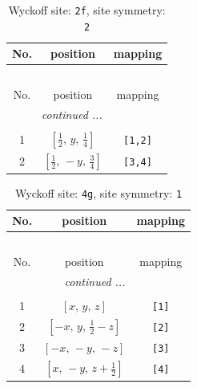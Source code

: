 \documentclass[fleqn,8pt]{jsarticle}
\begin{document}
\renewcommand{\arraystretch}{1.2}
\begin{longtable}{ccc}
\caption{Wyckoff site: {\tt 2f}, site symmetry: {\tt 2}}
 \\
 \hline \hline
No. & position & mapping \\ \hline \endfirsthead

\multicolumn{2}{l}{\tablename\ \thetable{}} \\
 \hline \hline
No. & position & mapping \\ \hline \endhead

 \hline \hline
\multicolumn{2}{r}{\footnotesize\it continued ...} \\ \endfoot

 \hline \hline
\multicolumn{2}{r}{} \\ \endlastfoot

1 & $\left[ \frac{1}{2},\, y,\, \frac{1}{4} \right]$ & {\tt [1,2]} \\ \hline
2 & $\left[ \frac{1}{2},\, - y,\, \frac{3}{4} \right]$ & {\tt [3,4]} \\
\end{longtable}
\renewcommand{\arraystretch}{1.2}
\begin{longtable}{ccc}
\caption{Wyckoff site: {\tt 4g}, site symmetry: {\tt 1}}
 \\
 \hline \hline
No. & position & mapping \\ \hline \endfirsthead

\multicolumn{2}{l}{\tablename\ \thetable{}} \\
 \hline \hline
No. & position & mapping \\ \hline \endhead

 \hline \hline
\multicolumn{2}{r}{\footnotesize\it continued ...} \\ \endfoot

 \hline \hline
\multicolumn{2}{r}{} \\ \endlastfoot

1 & $\left[ x,\, y,\, z \right]$ & {\tt [1]} \\ \hline
2 & $\left[ - x,\, y,\, \frac{1}{2} - z \right]$ & {\tt [2]} \\ \hline
3 & $\left[ - x,\, - y,\, - z \right]$ & {\tt [3]} \\ \hline
4 & $\left[ x,\, - y,\, z + \frac{1}{2} \right]$ & {\tt [4]} \\
\end{longtable}
\end{document}
